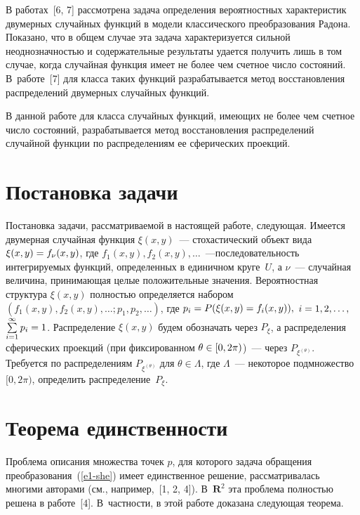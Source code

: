\begin{multicols}{2}
В работах~[6, 7] рассмотрена задача определения вероятностных
характеристик двумерных случайных функций в модели классического
преобразования Радона. Показано, что в общем случае эта задача
характеризуется сильной неоднозначностью и содержательные результаты
удается получить лишь в том случае, когда случайная функция имеет не
более чем счетное число состояний. В~работе~[7] для класса таких
функций разрабатывается метод восстановления распределений двумерных
случайных функций.

В данной работе для класса случайных функций, имеющих не более чем
счетное число состояний, разрабатывается метод восстановления
распределений случайной функции по распределениям ее сферических
проекций.

\section{Постановка задачи}

Постановка задачи, рассматриваемой в настоящей работе, следующая.
Имеется двумерная случайная функция $\xi(x,y)$~--- стохастический
объект вида $\xi(x,y) \hm= f_{\nu}(x,y)$, где
$f_{1}(x,y),f_{2}(x,y),\ldots$~---\linebreak последовательность интегрируемых
функций, определенных в единичном круге~$U$, а $\nu$~--- случайная
величина, принимающая целые положительные значения. Вероятностная
структура $\xi(x,y)$ полностью определяется набором
$(f_{1}(x,y),f_{2}(x,y),\ldots;p_{1},p_{2},\ldots)$, где
$p_{i}\hm=P(\xi(x,y) \hm= f_{i}(x,y)),$ $i \hm= 1,2,\ldots ,$ 
$\sum\limits_{i=1}^{\infty}p_{i} \hm= 1$. Распределение $\xi(x,y)$ будем
обозначать через $P_{\xi}$, а распределения сферических проекций
(при фиксированном $\theta\hm\in [0,2\pi)$)~--- через $P_{\xi^{(\theta)}}$.
Требуется по распределениям $P_{\xi^{(\theta)}}$ для
$\theta\in\Lambda$, где $\Lambda$~--- некоторое подмножество
$[0,2\pi)$, определить распределение~$P_{\xi}$.

\section{Теорема единственности}

Проблема описания множества точек $p$, для которого задача обращения
преобразования~(\ref{e1-she}) имеет единственное решение, рассматривалась
многими авторами (см., например,~[1, 2, 4]). В~$\mathbf{R}^2$ эта
проб\-ле\-ма полностью решена в работе~[4]. В~частности, в этой работе
доказана следующая теорема.

\medskip


\end{multicols}
